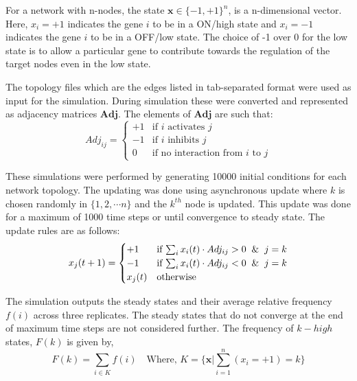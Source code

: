 \documentclass[11pt,a4paper]{article}
\theoremstyle{definition}
\theoremstyle{remark}
\begin{document}
For a network with n-nodes, the state $\mathbf{x} \in \{-1,+1\}^n$, is a n-dimensional vector. Here, $x_i = +1$ indicates the gene $i$ to be in a ON/high state and $x_i = -1$ indicates the gene $i$ to be in a OFF/low state. The choice of -1 over 0 for the low state is to allow a particular gene to contribute towards the regulation of the target nodes even in the low state. 

The topology files which are the edges listed in tab-separated format were used as input for the simulation. During simulation these were converted and represented as adjacency matrices $\mathbf{Adj}$. The elements of $\mathbf{Adj}$ are such that:
\begin{equation}
    Adj_{ij} = \begin{cases}
      +1 & \text{if $i$ activates $j$}\\
      -1 & \text{if $i$ inhibits $j$}\\
      0 & \text{if no interaction from $i$ to $j$}
    \end{cases}
    \label{adjmat-eq}
\end{equation}

These simulations were performed by generating 10000 initial conditions for each network topology. The updating was done using asynchronous update where $k$ is chosen randomly in $\{1,2,\cdots n\}$ and the $k^{th}$ node is updated. This update was done for a maximum of 1000 time steps or until convergence to steady state. The update rules are as follows:
\begin{equation}
    x_j(t+1) = \begin{cases}
      +1 & \text{if $\sum_i x_i(t) \cdot Adj_{ij} > 0 \And j=k$}\\
      -1 & \text{if $\sum_i x_i(t) \cdot Adj_{ij} < 0 \And j=k$}\\
      x_j(t) & \text{otherwise}
    \end{cases}  
    \label{async-update}
\end{equation}

The simulation outputs the steady states and their average relative frequency $f(i)$ across three replicates. The steady states that do not converge at the end of maximum time steps are not considered further. The frequency of $k-high$ states, $F(k)$ is given by,
\begin{equation}
    F(k) = \sum_{i \in K} f(i) \quad \text{Where, }
    K = \bigg\{\mathbf{x} \bigg| \sum^n_{i=1} (x_i = +1) = k \bigg\}
\end{equation}
\end{document}
